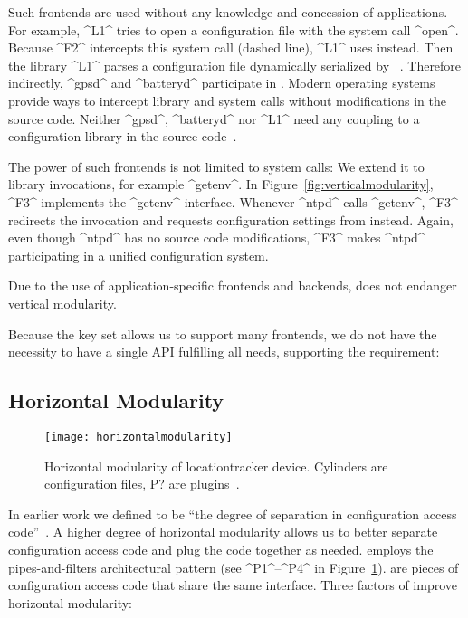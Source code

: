 Such frontends are used without any knowledge and concession of applications.
For example, ^L1^ tries to open a configuration file with the system call ^open^.
Because ^F2^ intercepts this system call (dashed line), ^L1^ uses \elektra{} instead.
Then the library ^L1^ parses a configuration file dynamically serialized by ~\cite{raab2017introducing}.
Therefore indirectly, ^gpsd^ and ^batteryd^ participate in .
Modern operating systems provide ways to intercept library and system calls without modifications in the source code.
Neither ^gpsd^, ^batteryd^ nor ^L1^ need any coupling to a configuration library in the source code~\cite{raab2016improving}.

The power of such frontends is not limited to system calls:
We extend it to library invocations, for example ^getenv^.
In Figure~\ref{fig:verticalmodularity}, ^F3^ implements the ^getenv^ interface.
Whenever ^ntpd^ calls ^getenv^, ^F3^ redirects the invocation and requests configuration settings from \elektra{} instead.
Again, even though ^ntpd^ has no source code modifications, ^F3^ makes ^ntpd^ participating in a unified configuration system.

\begin{finding}
Due to the use of application-specific frontends and backends, \elektra{} does not endanger vertical modularity.
\end{finding}

Because the key set allows us to support many frontends, we do not have the necessity to have a single API fulfilling all needs, supporting the requirement:
\reqMinimal*



\subsection{Horizontal Modularity}
\label{sec:backend-horizontal-modularity}

\begin{figure}[htp]
\centering
\texttt{[image: horizontalmodularity]}
\caption[Horizontal modularity.]{Horizontal modularity of locationtracker device. \textnormal{Cylinders are configuration files, P? are plugins~\cite{raab2016improving}.}}
\label{fig:horizontalmodularity}
\end{figure}


In earlier work we defined  to be ``the degree of separation in configuration access code''~\cite{raab2016improving}. 
A higher degree of horizontal modularity allows us to better separate configuration access code and plug the code together as needed.
 employs the pipes-and-filters architectural pattern (see ^P1^--^P4^ in Figure~\ref{fig:horizontalmodularity}).
 are pieces of configuration access code that share the same interface.
Three factors of  improve horizontal modularity:

